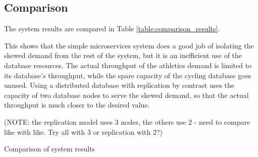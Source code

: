 %
%
\FloatBarrier
\subsection{Comparison}

\begin{shaded}
The system results are compared in Table \ref{table:comparison_results}.

This shows that the simple microservices system does a good job of isolating the skewed demand from the rest of the system, but it is an inefficient use of the database resources.  The actual throughput of the athletics demand is limited to its database's throughput, while the spare capacity of the cycling database goes unused.  Using a distributed database with replication by contrast uses the capacity of two database nodes to serve the skewed demand, so that the actual throughput is much closer to the desired value.

(NOTE: the replication model uses 3 nodes, the others use 2 - need to compare like with like.  Try all with 3 or replication with 2?)
\end{shaded}

\begin{table}[h!]
	\begin{center}
		\caption{Comparison of system results}
		\label{table:comparison_results}
	\end{center}
\end{table}

